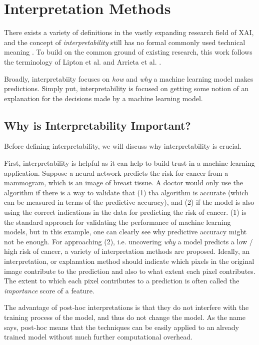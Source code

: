 \section{Interpretation Methods}
\label{sec:interpretation_methods}

There exists a variety of definitions in the vastly expanding research field of XAI, and the concept of \textit{interpretability} still has no formal commonly used technical meaning \cite{lipton2018mythos}. To build on the common ground of existing research, this work follows the terminology of Lipton et al. \cite{lipton2018mythos} and Arrieta et al. \cite{arrieta2020explainable}.

Broadly, interpretabiity focuses on \textit{how} and \textit{why} a machine learning model makes predictions.
Simply put, interpretability is focused on getting some notion of an explanation for the decisions made by a machine learning model.

\subsection{Why is Interpretability Important?}
\label{subsec:importance_of_interpretability}
Before defining interpretability, we will discuss why interpretability is crucial. 

First, interpretability is helpful as it can help to build trust in a machine learning application. Suppose a neural network predicts the risk for cancer from a mammogram, which is an image of breast tissue. A doctor would only use the algorithm if there is a way to validate that (1) tha algorithm is accurate (which can be measured in terms of the predictive accuracy), and (2) if the model is also using the correct indications in the data for predicting the risk of cancer. (1) is the standard approach for validating the performance of machine learning models, but in this example, one can clearly see why predictive accuracy might not be enough. For approaching (2), i.e. uncovering \textit{why} a model predicts a low / high risk of cancer, a variety of interpretation methods are proposed.  
Ideally, an interpretation, or explanation method should indicate which pixels in the original image contribute to the prediction and also to what extent each pixel contributes. The extent to which each pixel contributes to a prediction is often called the \textit{importance} score of a feature. 

The advantage of post-hoc interpretations is that they do not interfere with the training process of the model, and thus do not change the model. As the name says, post-hoc means that the techniques can be easily applied to an already trained model without much further computational overhead. 

